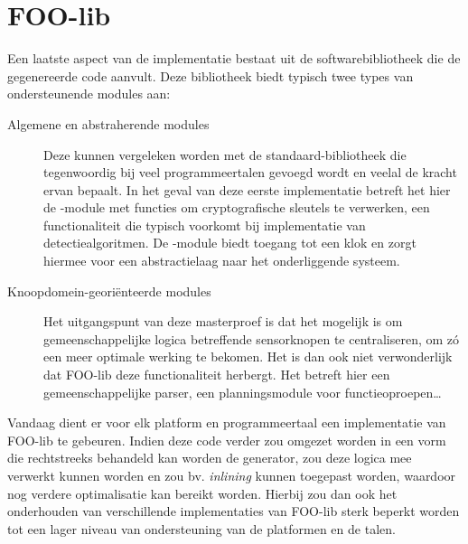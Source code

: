 
\section{FOO-lib}
\label{section:devel-foo-lib}

Een laatste aspect van de implementatie bestaat uit de softwarebibliotheek die
de gegenereerde code aanvult. Deze bibliotheek biedt typisch twee types van
ondersteunende modules aan:

\begin{description}

\item[Algemene en abstraherende modules] Deze kunnen vergeleken worden met de
standaard-bibliotheek die tegenwoordig bij veel programmeertalen gevoegd wordt
en veelal de kracht ervan bepaalt. In het geval van deze eerste implementatie
betreft het hier de -module met functies om cryptografische
sleutels te verwerken, een functionaliteit die typisch voorkomt bij
implementatie van detectiealgoritmen. De -module biedt toegang tot
een klok en zorgt hiermee voor een abstractielaag naar het onderliggende
systeem.

\item[Knoopdomein-geori\"enteerde modules] Het uitgangspunt van deze
masterproef is dat het mogelijk is om gemeenschappelijke logica betreffende
sensorknopen te centraliseren, om z\'o een meer optimale werking te bekomen.
Het is dan ook niet verwonderlijk dat FOO-lib deze functionaliteit herbergt.
Het betreft hier een gemeenschappelijke parser, een planningsmodule voor
functieoproepen\dots

\end{description}

Vandaag dient er voor elk platform en programmeertaal een implementatie van
FOO-lib te gebeuren. Indien deze code verder zou omgezet worden in een vorm die
rechtstreeks behandeld kan worden de generator, zou deze logica mee verwerkt
kunnen worden en zou bv. \emph{inlining} kunnen toegepast worden, waardoor nog
verdere optimalisatie kan bereikt worden. Hierbij zou dan ook het onderhouden
van verschillende implementaties van FOO-lib sterk beperkt worden tot een lager
niveau van ondersteuning van de platformen en de talen.
